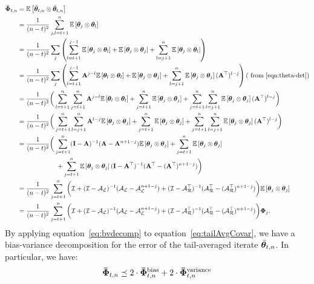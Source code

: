 \begin{align}
\label{eq:tailAvgCovar}
\phivb_{t,n}&=\E{\thetavb\otimes\thetavb}\nonumber\\
&=\frac{1}{(n-t)^2}\sum_{j,l=t+1}^n\E{\thetav_j\otimes\thetav_l}\nonumber\\
&=\frac{1}{(n-t)^2}\sum_j\left(\sum_{l=t+1}^{j-1}\E{\thetav_j\otimes\thetav_l}+\E{\thetav_j\otimes\thetav_j}+\sum_{l=j+1}^n\E{\thetav_j\otimes\thetav_l}\right)\nonumber\\
&=\frac{1}{(n-t)^2}\sum_j\left(\sum_{l=t+1}^{j-1}\A^{j-l}\E{\thetav_l\otimes\thetav_l}+\E{\thetav_j\otimes\thetav_j}+\sum_{l=j+1}^n\E{\thetav_j\otimes\thetav_j}(\A\T)^{l-j}\right) \left(\mbox{ from~\eqref{eqn:theta-det}}\right) \nonumber\\
&=\frac{1}{(n-t)^2}\bigg(\sum_{l=t+1}^n\sum_{j=l+1}^n\A^{j-l}\E{\thetav_l\otimes\thetav_l} + \sum_{j=t+1}^n\E{\thetav_j\otimes\thetav_j}+\sum_{j=t+1}^n\sum_{l=j+1}^n\E{\thetav_j\otimes\thetav_j}(\A\T)^{l-j}\bigg)\nonumber\\
&=\frac{1}{(n-t)^2}\bigg(\sum_{j=t+1}^n\sum_{l=j+1}^n\A^{l-j}\E{\thetav_j\otimes\thetav_j} + \sum_{j=t+1}^n\E{\thetav_j\otimes\thetav_j}+\sum_{j=t+1}^n\sum_{l=j+1}^n\E{\thetav_j\otimes\thetav_j}(\A\T)^{l-j}\bigg)\nonumber\\
&=\frac{1}{(n-t)^2}\bigg(\sum_{j=t+1}^n(\eye-\A)^{-1}(\A-\A^{n+1-j})\E{\thetav_j\otimes\thetav_j} + \sum_{j=t+1}^n\E{\thetav_j\otimes\thetav_j}\nonumber\\&\quad\quad\quad\quad\quad\quad +\sum_{j=t+1}^n\E{\thetav_j\otimes\thetav_j}(\eye-\A\T)^{-1}(\A\T-(\A\T)^{n+1-j})\bigg)\nonumber\\
&=\frac{1}{(n-t)^2}\sum_{j=t+1}^n\bigg( \eyeT + (\eyeT-\AL)^{-1}(\AL-\AL^{n+1-j}) + (\eyeT-\AR\T)^{-1}(\AR\T-(\AR\T)^{n+1-j}) \bigg)\E{\thetav_j\otimes\thetav_j}\nonumber\\
&=\frac{1}{(n-t)^2}\sum_{j=t+1}^n\bigg( \eyeT + (\eyeT-\AL)^{-1}(\AL-\AL^{n+1-j}) + (\eyeT-\AR\T)^{-1}(\AR\T-(\AR\T)^{n+1-j}) \bigg)\phiv_j.
\end{align}
\iffalse
{}
By applying equation~\ref{eq:bvdecomp} to equation~\ref{eq:tailAvgCovar}, we have a bias-variance decomposition for the error of the tail-averaged iterate ${\bar{\boldsymbol{\theta}}}_{t,n}$. In particular, we have:
\begin{align}
\label{eq:tailAvgCovarBound}
\phivb_{t,n}\preceq 2\cdot\phivb_{t,n}^{\text{bias}}+2\cdot\phivb_{t,n}^{\text{variance}}
\end{align}
